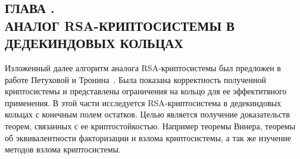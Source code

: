 \documentclass[_00_dissertation.tex]{subfiles}
\begin{document}
\onlyinsubfile{
    \renewcommand{\contentsname}{ОГЛАВЛЕНИЕ}
    \setcounter{tocdepth}{3}
    \tableofcontents
}

\begin{center}
    \chapter*{ГЛАВА .\\ АНАЛОГ RSA-КРИПТОСИСТЕМЫ В ДЕДЕКИНДОВЫХ КОЛЬЦАХ}\label{chapter:RSA-cryptosystem}
\end{center}

Изложенный далее алгоритм аналога RSA-криптосистемы был предложен в работе Петуховой и Тронина~\cite{source:Petukhova}.
Была показана корректность полученной криптосистемы и представлены ограничения  на кольцо для ее эффектитвного применения.
В этой части исследуется RSA-криптосистема в дедекиндовых кольцах с конечным полем остатков.
Целью является получение доказательств теорем, связанных с ее криптостойкостью.
Например теоремы Винера, теоремы об эквивалентности факторизации и взлома криптосистемы, а так же изучение методов взлома криптосистемы.
\end{document}
